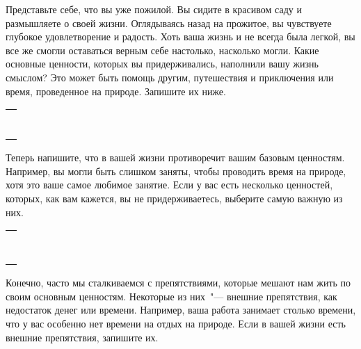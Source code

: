  \label{Ex:Discovering_Our_Core_Values}
\begin{itemize}
	\itemWritingHand Представьте себе, что вы уже пожилой. Вы сидите в красивом саду и размышляете о своей жизни. Оглядываясь назад на прожитое, вы чувствуете глубокое удовлетворение и радость. Хоть ваша жизнь и не всегда была легкой, вы все же смогли оставаться верным себе настолько, насколько могли. Какие основные ценности, которых вы придерживались, наполнили вашу жизнь смыслом? Это может быть помощь другим, путешествия и приключения или время, проведенное на природе. Запишите их ниже.
\end{itemize}

\setlength{\extrarowheight}{2mm}
\begin{tabularx}{0.96\textwidth}{X}
	\\
	\arrayrulecolor{gray}\hline\\
	\hline\\
	\hline\\
	\hline\\
	\hline\\
	\hline\\	
	\hline\\
	\hline\\
\end{tabularx}
\setlength{\extrarowheight}{0mm}
\begin{itemize}
	\itemWritingHand Теперь напишите, что в вашей жизни противоречит вашим базовым ценностям. Например, вы могли быть слишком заняты, чтобы проводить время на природе, хотя это ваше самое любимое занятие.  Если у вас есть несколько ценностей, которых, как вам кажется, вы не придерживаетесь, выберите самую важную из них.
\end{itemize}

\setlength{\extrarowheight}{2mm}
\begin{tabularx}{0.96\textwidth}{X}
	\\
	\arrayrulecolor{gray}\hline\\
	\hline\\
	\hline\\
	\hline\\
	\hline\\
	\hline\\	
	\hline\\
	\hline\\
	\hline\\
\end{tabularx}
\setlength{\extrarowheight}{0mm}
\begin{itemize}
	\itemWritingHand Конечно, часто мы сталкиваемся с препятствиями, которые мешают нам жить по своим основным ценностям. Некоторые из них~"--- внешние препятствия, как недостаток денег или времени. Например, ваша работа занимает столько времени, что у вас особенно нет времени на отдых на природе. Если в вашей жизни есть внешние препятствия, запишите их.
\end{itemize}

